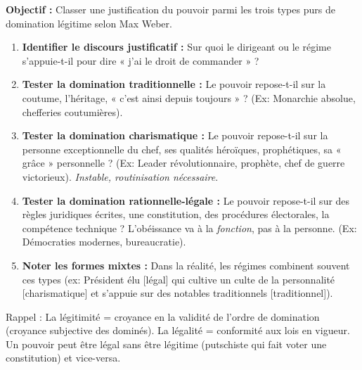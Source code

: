 \documentclass[11pt]{article}
\newcommand{\cle}[1]{{\popxbold\color{popdark}#1}}
\begin{document}
\begin{methode}
\textbf{Objectif :} Classer une justification du pouvoir parmi les trois types purs de domination légitime selon Max Weber.
\begin{enumerate}
    \item \textbf{Identifier le discours justificatif :} Sur quoi le dirigeant ou le régime s'appuie-t-il pour dire « j'ai le droit de commander » ?
    \item \textbf{Tester la \textbf{domination traditionnelle} :} Le pouvoir repose-t-il sur la coutume, l'héritage, « c'est ainsi depuis toujours » ? (Ex: Monarchie absolue, chefferies coutumières).
    \item \textbf{Tester la \textbf{domination charismatique} :} Le pouvoir repose-t-il sur la personne exceptionnelle du chef, ses qualités héroïques, prophétiques, sa « grâce » personnelle ? (Ex: Leader révolutionnaire, prophète, chef de guerre victorieux). \emph{Instable, routinisation nécessaire}.
    \item \textbf{Tester la \textbf{domination rationnelle-légale} :} Le pouvoir repose-t-il sur des règles juridiques écrites, une constitution, des procédures électorales, la compétence technique ? L'obéissance va à la \emph{fonction}, pas à la personne. (Ex: Démocraties modernes, bureaucratie).
    \item \textbf{Noter les formes mixtes :} Dans la réalité, les régimes combinent souvent ces types (ex: Président élu [légal] qui cultive un culte de la personnalité [charismatique] et s'appuie sur des notables traditionnels [traditionnel]).
\end{enumerate}
\cle{Rappel} : La légitimité = croyance en la validité de l'ordre de domination (croyance subjective des dominés). La légalité = conformité aux lois en vigueur. Un pouvoir peut être légal sans être légitime (putschiste qui fait voter une constitution) et vice-versa.
\end{methode}
\end{document}
